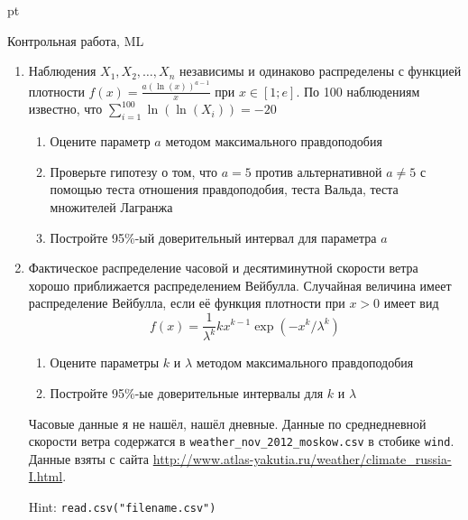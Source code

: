 \documentclass[pdftex,12pt,a4paper]{article}
\begin{document}
 pt %

\begin{center}
Контрольная работа, ML
\end{center}

\WhiteRoseLine

\begin{enumerate}
\item Наблюдения $X_1,X_2,\ldots,X_n$ независимы и одинаково распределены с функцией плотности $f(x)=\frac{a(\ln(x))^{a-1}}{x}$ при $x\in [1;e]$. По 100 наблюдениям известно, что $\sum_{i=1}^{100} \ln(\ln(X_i))=-20$
\begin{enumerate}
\item Оцените параметр $a$ методом максимального правдоподобия
\item Проверьте гипотезу о том, что $a=5$ против альтернативной $a\neq 5$ с помощью теста отношения правдоподобия, теста Вальда, теста множителей Лагранжа
\item Постройте 95\%-ый доверительный интервал для параметра $a$
\end{enumerate}
\item \useR Фактическое распределение часовой и десятиминутной скорости ветра хорошо приближается распределением Вейбулла. Случайная величина имеет распределение Вейбулла, если её функция плотности при $x>0$ имеет вид
\[
f(x)=\frac{1}{\lambda^k}kx^{k-1}\exp(-x^k/\lambda^k)
\]
\begin{enumerate}
\item Оцените параметры $k$ и $\lambda$ методом максимального правдоподобия
\item Постройте 95\%-ые доверительные интервалы для $k$ и $\lambda$
\end{enumerate}
Часовые данные я не нашёл, нашёл дневные. Данные по среднедневной скорости ветра содержатся в \verb|weather_nov_2012_moskow.csv| в стобике \verb|wind|. Данные взяты с сайта \url{http://www.atlas-yakutia.ru/weather/climate_russia-I.html}.

Hint: \verb|read.csv("filename.csv")|
\end{enumerate}
\end{document}
